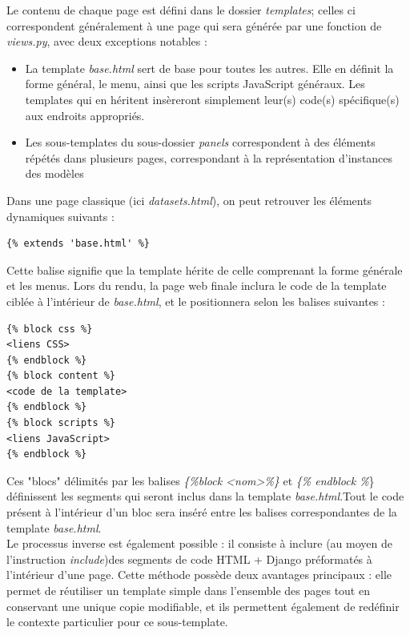 \documentclass[a4paper]{report}
\begin{document}
Le contenu de chaque page est défini dans le dossier \emph{templates}; celles ci correspondent généralement à une page qui sera générée par une fonction de \emph{views.py}, avec deux exceptions notables :
\begin{itemize}
	\item La template \emph{base.html} sert de base pour toutes les autres. Elle en définit la forme général, le menu, ainsi que les scripts JavaScript généraux. Les templates qui en héritent insèreront simplement leur(s) code(s) spécifique(s) aux endroits appropriés.
	\item Les sous-templates du sous-dossier \emph{panels} correspondent à des éléments répétés dans plusieurs pages, correspondant à la représentation d'instances des modèles
\end{itemize}

Dans une page classique (ici \emph{datasets.html}), on peut retrouver les éléments dynamiques suivants :

\begin{verbatim}
{% extends 'base.html' %}
\end{verbatim}

Cette balise signifie que la template hérite de celle comprenant la forme générale et les menus. Lors du rendu, la page web finale inclura le code de la template ciblée à l'intérieur de \emph{base.html}, et le positionnera selon les balises suivantes :

\begin{verbatim}
{% block css %}
<liens CSS>
{% endblock %}
{% block content %}
<code de la template>
{% endblock %}
{% block scripts %}
<liens JavaScript>
{% endblock %}
\end{verbatim}

Ces "blocs" délimités par les balises \emph{\{\%block <nom>\%\}} et \emph{\{\% endblock \%}\} définissent les segments qui seront inclus dans la template \emph{base.html}.Tout le code présent à l'intérieur d'un bloc sera inséré entre les balises correspondantes de la template \emph{base.html}.\\

Le processus inverse est également possible : il consiste à inclure (au moyen de l'instruction \emph{include})des segments de code HTML + Django préformatés à l'intérieur d'une page. Cette méthode possède deux avantages principaux : elle permet de réutiliser un template simple dans l'ensemble des pages tout en conservant une unique copie modifiable, et ils permettent également de redéfinir le contexte particulier pour ce sous-template.\\
\end{document}
